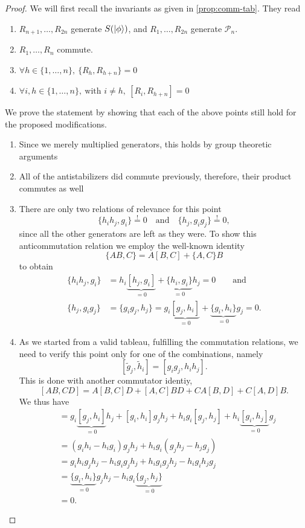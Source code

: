 \begin{proof}
  We will first recall the invariants as given in \cref{prop:comm-tab}.
  They read
  \begin{enumerate}
    \item $R_{n+1},\ldots,R_{2n}$ generate $S(\ket{\phi})$, and $R_1, \ldots,
      R_{2n}$ generate $\mathcal{P}_n$.
    \item $R_1, \ldots, R_n$ commute.
    \item $\forall h \in \{1,\ldots,n\}, \ \{R_h, R_{h+n}\} = 0$
    \item $\forall i,h \in \{1,\ldots,n\}, \ \text{with } i\neq h, \ [R_i, R_{h+n}] = 0$
  \end{enumerate}
  We prove the statement by showing that each of the above points still hold
  for the proposed modifications.
  \begin{enumerate}
    \item Since we merely multiplied generators, this holds by group theoretic
      arguments
    \item All of the antistabilizers did commute previously, therefore, their
      product commutes as well
    \item There are only two relations of relevance for this point
      \[
        \{h_i h_j, g_i\} \overset{\text{!}}{=} 0 \quad{\text{and}} \quad 
        \{h_j, g_i g_j\} \overset{\text{!}}{=} 0, 
      \]
      since all the other generators are left as they were.
      To show this anticommutation relation we employ the well-known identity
      \[ \{AB,C\} = A[B,C] + \{A,C\}B \]
      to obtain
      \begin{align*}
        \{h_i h_j, g_i \} &= h_i \underbrace{[h_j, g_i]}_{=0} +
        \underbrace{\{h_i, g_i\}}_{=0} h_j = 0 \qquad{\text{and}} \\
        \{h_j, g_i g_j \} &= \{g_i g_j, h_j\} = g_i \underbrace{[g_j, h_i]}_{=0} +
        \underbrace{\{g_i, h_i\}}_{=0} g_j = 0
      .\end{align*}
    \item As we started from a valid tableau, fulfilling the commutation
      relations, we need to verify this point only for one of the combinations,
      namely \[ [\tilde{g}_j, \tilde{h}_i] = [ g_i g_j, h_i h_j]. \]
      This is done with another commutator identiy,
      \[
        [AB,CD] = A[B,C]D + [A,C]BD + CA[B,D] + C[A,D]B.
      \]
      We thus have
      \begin{align*}
        [g_i g_j, h_i h_j] &=
          g_i \underbrace{[g_j, h_i]}_{=0} h_j + [g_i, h_i] g_j h_j + h_i g_i
          [g_j, h_j] + h_i \underbrace{[g_i, h_j]}_{=0} g_j \\
           &= (g_i h_i - h_i g_i)g_j h_j + h_i g_i (g_j h_j - h_j g_j) \\
           &= g_i h_i g_j h_j - h_i g_i g_j h_j + h_i g_i g_j h_j - h_i g_i h_j
           g_j \\
           &= \underbrace{\{g_i, h_i\}}_{=0} g_j h_j - h_i g_i
           \underbrace{\{g_j, h_j\}}_{=0} \\
           &= 0
      .\end{align*}
  \end{enumerate}
\end{proof}

